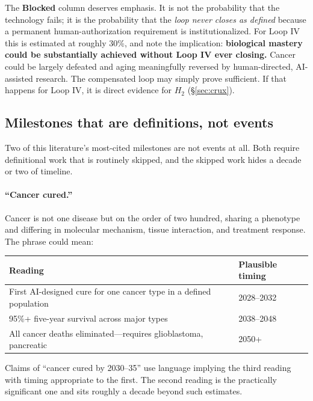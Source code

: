 \documentclass[11pt]{article}
\begin{document}
The \textbf{Blocked} column deserves emphasis. It is not the probability that the technology fails; it is the probability that the \emph{loop never closes as defined} because a permanent human-authorization requirement is institutionalized. For Loop IV this is estimated at roughly 30\%, and note the implication: \textbf{biological mastery could be substantially achieved without Loop IV ever closing.} Cancer could be largely defeated and aging meaningfully reversed by human-directed, AI-assisted research. The compensated loop may simply prove sufficient. If that happens for Loop IV, it is direct evidence for $H_2$ (\S\ref{sec:crux}).

\subsection{Milestones that are definitions, not events}
\label{sec:definitional}

Two of this literature's most-cited milestones are not events at all. Both require definitional work that is routinely skipped, and the skipped work hides a decade or two of timeline.

\paragraph{``Cancer cured.''} Cancer is not one disease but on the order of two hundred, sharing a phenotype and differing in molecular mechanism, tissue interaction, and treatment response. The phrase could mean:

\begin{table}[h]
\centering
\footnotesize
\begin{tabular}{@{}L{8.4cm}l@{}}
\toprule
Reading & Plausible timing \\
\midrule
First AI-designed cure for one cancer type in a defined population & 2028--2032 \\
95\%+ five-year survival across major types & 2038--2048 \\
All cancer deaths eliminated---requires glioblastoma, pancreatic & 2050+ \\
\bottomrule
\end{tabular}
\end{table}

Claims of ``cancer cured by 2030--35'' use language implying the third reading with timing appropriate to the first. The second reading is the practically significant one and sits roughly a decade beyond such estimates.
\end{document}
